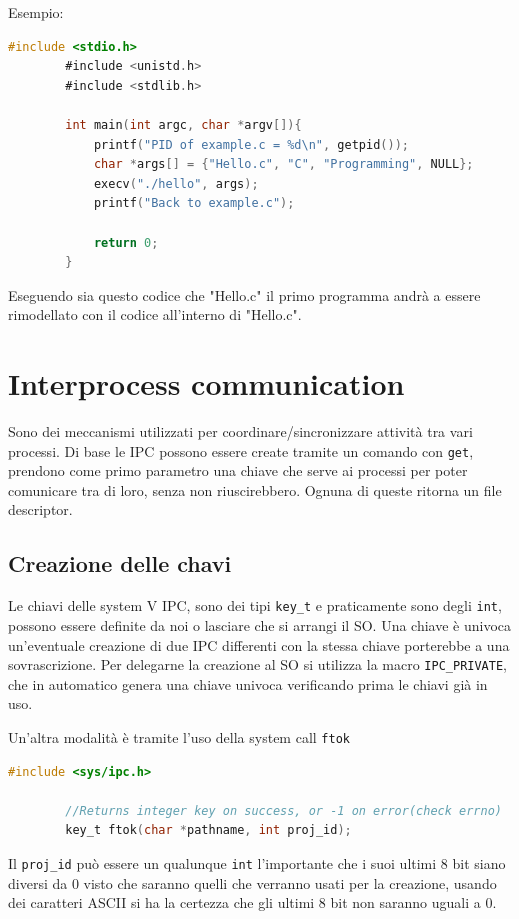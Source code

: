 \documentclass[a4paper, 12pt]{book}
\begin{document}
    Esempio:
    \begin{lstlisting}[language=C]
        #include <stdio.h>
        #include <unistd.h>
        #include <stdlib.h>
        
        int main(int argc, char *argv[]){
            printf("PID of example.c = %d\n", getpid());
            char *args[] = {"Hello.c", "C", "Programming", NULL};
            execv("./hello", args);
            printf("Back to example.c");

            return 0;
        }
    \end{lstlisting}
    Eseguendo sia questo codice che "Hello.c" il primo programma 
    andrà a essere rimodellato con il codice all'interno di "Hello.c".

    \chapter{Interprocess communication}

    Sono dei meccanismi utilizzati per coordinare/sincronizzare attività 
    tra vari processi. Di base le IPC possono essere create tramite 
    un comando con \verb|get|, prendono come primo parametro 
    una chiave che serve ai processi per poter comunicare 
    tra di loro, senza non riuscirebbero. Ognuna di queste 
    ritorna un file descriptor.

    \section{Creazione delle chavi}

    Le chiavi delle system V IPC, sono dei tipi \verb|key_t|
    e praticamente sono degli \verb|int|, possono essere definite 
    da noi o lasciare che si arrangi il SO. Una chiave è univoca 
    un'eventuale creazione di due IPC differenti con la stessa 
    chiave porterebbe a una sovrascrizione. Per delegarne 
    la creazione al SO si utilizza la macro \verb|IPC_PRIVATE|, 
    che in automatico genera una chiave univoca verificando 
    prima le chiavi già in uso.

    Un'altra modalità è tramite l'uso della system call 
    \verb|ftok| 
    \begin{lstlisting}[language=C]
        #include <sys/ipc.h>

        //Returns integer key on success, or -1 on error(check errno)
        key_t ftok(char *pathname, int proj_id);
    \end{lstlisting}
    Il \verb|proj_id| può essere un qualunque \verb|int| 
    l'importante che i suoi ultimi 8 bit siano diversi da 0
    visto che saranno quelli che verranno usati per la creazione, 
    usando dei caratteri ASCII si ha la certezza che gli 
    ultimi 8 bit non saranno uguali a 0.
    
\end{document}

